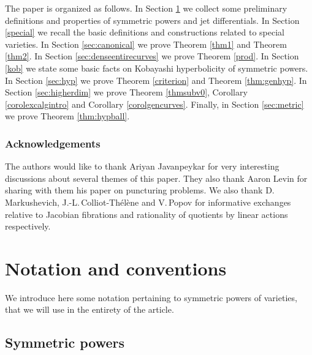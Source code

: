 \documentclass[JEP,XML,SOM,Unicode, NoEqCountersInSection,NoFloatCountersInSection,published]{cedram}
\theoremstyle{theorem}
\theoremstyle{definition}
\begin{document}
The paper is organized as follows. In Section \ref{notations} we collect some preliminary definitions and properties of symmetric powers and jet differentials. In Section \ref{special} we recall the basic definitions and constructions related to special varieties. In Section \ref{sec:canonical} we prove Theorem \ref{thm1} and Theorem \ref{thm2}. In Section \ref{sec:denseentirecurves} we prove Theorem \ref{prod}. In Section \ref{kob} we state some basic facts on Kobayashi hyperbolicity of symmetric powers. In Section \ref{sec:hyp} we prove Theorem \ref{criterion} and Theorem \ref{thm:genhyp}. In Section \ref{sec:higherdim} we prove Theorem \ref{thmsubv0}, Corollary \ref{corolexcalgintro} and Corollary \ref{corolgencurves}. Finally, in Section \ref{sec:metric} we prove Theorem \ref{thm:hypball}.

\subsubsection*{Acknowledgements}
The authors would like to thank Ariyan Javanpeykar for very interesting discussions about several themes of this paper. They also thank Aaron Levin for sharing with them his paper on puncturing problems. We also thank D.\,Markushevich, J.-L.\,Colliot-Thélène and V.\,Popov for informative exchanges relative to Jacobian fibrations and rationality of quotients by linear actions respectively.

\section{Notation and conventions}\label{notations}
We introduce here some notation pertaining to symmetric powers of varieties, that we will use in the entirety of the article.

\subsection{Symmetric powers}\label{sectnot}
\end{document}

